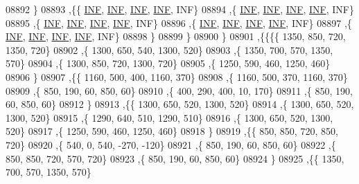 \begin{DoxyCode}
08892     \}
08893    ,\{\{   \hyperlink{constants_8h_a12c2040f25d8e3a7b9e1c2024c618cb6}{INF},   \hyperlink{constants_8h_a12c2040f25d8e3a7b9e1c2024c618cb6}{INF},   \hyperlink{constants_8h_a12c2040f25d8e3a7b9e1c2024c618cb6}{INF},   \hyperlink{constants_8h_a12c2040f25d8e3a7b9e1c2024c618cb6}{INF},   INF\}
08894     ,\{   \hyperlink{constants_8h_a12c2040f25d8e3a7b9e1c2024c618cb6}{INF},   \hyperlink{constants_8h_a12c2040f25d8e3a7b9e1c2024c618cb6}{INF},   \hyperlink{constants_8h_a12c2040f25d8e3a7b9e1c2024c618cb6}{INF},   \hyperlink{constants_8h_a12c2040f25d8e3a7b9e1c2024c618cb6}{INF},   INF\}
08895     ,\{   \hyperlink{constants_8h_a12c2040f25d8e3a7b9e1c2024c618cb6}{INF},   \hyperlink{constants_8h_a12c2040f25d8e3a7b9e1c2024c618cb6}{INF},   \hyperlink{constants_8h_a12c2040f25d8e3a7b9e1c2024c618cb6}{INF},   \hyperlink{constants_8h_a12c2040f25d8e3a7b9e1c2024c618cb6}{INF},   INF\}
08896     ,\{   \hyperlink{constants_8h_a12c2040f25d8e3a7b9e1c2024c618cb6}{INF},   \hyperlink{constants_8h_a12c2040f25d8e3a7b9e1c2024c618cb6}{INF},   \hyperlink{constants_8h_a12c2040f25d8e3a7b9e1c2024c618cb6}{INF},   \hyperlink{constants_8h_a12c2040f25d8e3a7b9e1c2024c618cb6}{INF},   INF\}
08897     ,\{   \hyperlink{constants_8h_a12c2040f25d8e3a7b9e1c2024c618cb6}{INF},   \hyperlink{constants_8h_a12c2040f25d8e3a7b9e1c2024c618cb6}{INF},   \hyperlink{constants_8h_a12c2040f25d8e3a7b9e1c2024c618cb6}{INF},   \hyperlink{constants_8h_a12c2040f25d8e3a7b9e1c2024c618cb6}{INF},   INF\}
08898     \}
08899    \}
08900   \}
08901  ,\{\{\{\{  1350,   850,   720,  1350,   720\}
08902     ,\{  1300,   650,   540,  1300,   520\}
08903     ,\{  1350,   700,   570,  1350,   570\}
08904     ,\{  1300,   850,   720,  1300,   720\}
08905     ,\{  1250,   590,   460,  1250,   460\}
08906     \}
08907    ,\{\{  1160,   500,   400,  1160,   370\}
08908     ,\{  1160,   500,   370,  1160,   370\}
08909     ,\{   850,   190,    60,   850,    60\}
08910     ,\{   400,   290,   400,    10,   170\}
08911     ,\{   850,   190,    60,   850,    60\}
08912     \}
08913    ,\{\{  1300,   650,   520,  1300,   520\}
08914     ,\{  1300,   650,   520,  1300,   520\}
08915     ,\{  1290,   640,   510,  1290,   510\}
08916     ,\{  1300,   650,   520,  1300,   520\}
08917     ,\{  1250,   590,   460,  1250,   460\}
08918     \}
08919    ,\{\{   850,   850,   720,   850,   720\}
08920     ,\{   540,     0,   540,  -270,  -120\}
08921     ,\{   850,   190,    60,   850,    60\}
08922     ,\{   850,   850,   720,   570,   720\}
08923     ,\{   850,   190,    60,   850,    60\}
08924     \}
08925    ,\{\{  1350,   700,   570,  1350,   570\}

\end{DoxyCode}
